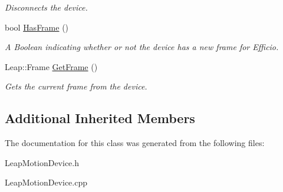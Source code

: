 \begin{DoxyCompactItemize}
\begin{DoxyCompactList}\small\item\em Disconnects the device. \end{DoxyCompactList}\item 
bool \hyperlink{class_efficio_1_1_leap_motion_device_ad5a6c2c51426dd7544912d0d729984f6}{Has\+Frame} ()\hypertarget{class_efficio_1_1_leap_motion_device_ad5a6c2c51426dd7544912d0d729984f6}{}\label{class_efficio_1_1_leap_motion_device_ad5a6c2c51426dd7544912d0d729984f6}

\begin{DoxyCompactList}\small\item\em A Boolean indicating whether or not the device has a new frame for Efficio. \end{DoxyCompactList}\item 
Leap\+::\+Frame \hyperlink{class_efficio_1_1_leap_motion_device_ad8069e5e4c4fc0033b0b19c703a89a0d}{Get\+Frame} ()\hypertarget{class_efficio_1_1_leap_motion_device_ad8069e5e4c4fc0033b0b19c703a89a0d}{}\label{class_efficio_1_1_leap_motion_device_ad8069e5e4c4fc0033b0b19c703a89a0d}

\begin{DoxyCompactList}\small\item\em Gets the current frame from the device. \end{DoxyCompactList}\end{DoxyCompactItemize}
\subsection*{Additional Inherited Members}


The documentation for this class was generated from the following files\+:\begin{DoxyCompactItemize}
\item 
Leap\+Motion\+Device.\+h\item 
Leap\+Motion\+Device.\+cpp\end{DoxyCompactItemize}

